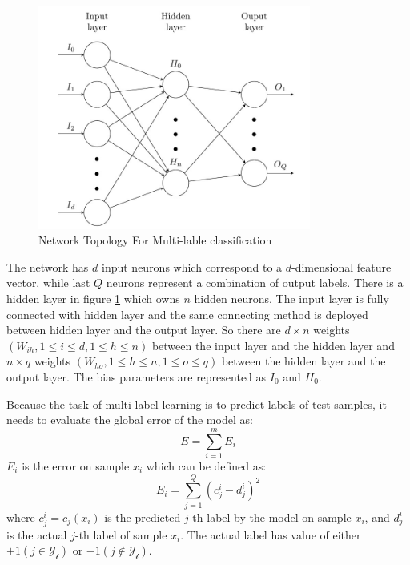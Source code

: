\graphicspath{ {./Figures/} }
\begin{figure}[!htb]
\centering
\includegraphics[width=0.8\textwidth]{MultiLabelNet.jpeg}
\caption{\label{fig:MultiLabelNet}Network Topology For Multi-lable classification}
\end{figure}

The network has $d$ input neurons which correspond to a $d$-dimensional feature vector, while last $Q$ neurons represent a combination of output labels. There is a hidden layer in figure \ref{fig:MultiLabelNet} which owns $n$ hidden neurons. The input layer is fully connected with hidden layer and the same connecting method is deployed between hidden layer and the output layer. So there are $d \times n$ weights $(W_{ih}, 1 \leq i \leq d, 1 \leq h \leq n)$ between the input layer and the hidden layer and $n \times q$ weights $(W_{ho}, 1 \leq h \leq n , 1 \leq o \leq q)$ between the hidden layer and the output layer. The bias parameters are represented as $I_{0}$ and  $H_{0}$.

Because the task of multi-label learning is to predict labels of test samples, it needs to evaluate the global error of the model as:
\begin{equation}\label{eq:MultiLableError}
E = \sum_{i=1}^m E_{i}
\end{equation}
$E_{i}$ is the error on sample $x_{i}$ which can be defined as:
\begin{equation}\label{eq:MultiLableSamError}
E_{i} = \sum_{j=1}^Q (c_{j}^i - d_{j}^i)^2
\end{equation}
where $c_{j}^i = c_{j}(x_{i})$ is the predicted $j$-th label by the model on sample $x_{i}$, and $d_{j}^i$ is the actual $j$-th label of sample $x_{i}$. The actual label has value of either $+1 (j \in \mathcal{Y_{i}})$ or $-1 (j \notin \mathcal{Y_{i}})$.

